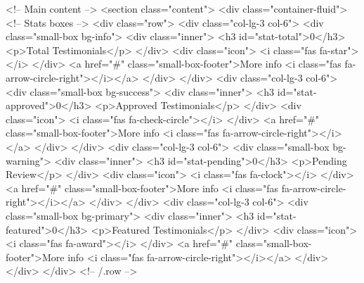         <!-- Main content -->
        <section class="content">
            <div class="container-fluid">
                <!-- Stats boxes -->
                <div class="row">
                    <div class="col-lg-3 col-6">
                        <div class="small-box bg-info">
                            <div class="inner">
                                <h3 id="stat-total">0</h3>
                                <p>Total Testimonials</p>
                            </div>
                            <div class="icon">
                                <i class="fas fa-star"></i>
                            </div>
                            <a href="#" class="small-box-footer">More info <i class="fas fa-arrow-circle-right"></i></a>
                        </div>
                    </div>
                    <div class="col-lg-3 col-6">
                        <div class="small-box bg-success">
                            <div class="inner">
                                <h3 id="stat-approved">0</h3>
                                <p>Approved Testimonials</p>
                            </div>
                            <div class="icon">
                                <i class="fas fa-check-circle"></i>
                            </div>
                            <a href="#" class="small-box-footer">More info <i class="fas fa-arrow-circle-right"></i></a>
                        </div>
                    </div>
                    <div class="col-lg-3 col-6">
                        <div class="small-box bg-warning">
                            <div class="inner">
                                <h3 id="stat-pending">0</h3>
                                <p>Pending Review</p>
                            </div>
                            <div class="icon">
                                <i class="fas fa-clock"></i>
                            </div>
                            <a href="#" class="small-box-footer">More info <i class="fas fa-arrow-circle-right"></i></a>
                        </div>
                    </div>
                    <div class="col-lg-3 col-6">
                        <div class="small-box bg-primary">
                            <div class="inner">
                                <h3 id="stat-featured">0</h3>
                                <p>Featured Testimonials</p>
                            </div>
                            <div class="icon">
                                <i class="fas fa-award"></i>
                            </div>
                            <a href="#" class="small-box-footer">More info <i class="fas fa-arrow-circle-right"></i></a>
                        </div>
                    </div>
                </div>
                <!-- /.row -->

